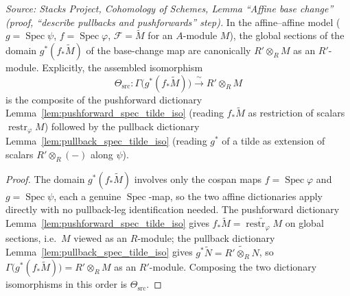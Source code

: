 \begin{lemma}



  \label{lem:base_change_mate_domain_read}
  \textit{Source: Stacks Project, Cohomology of Schemes, Lemma ``Affine base
  change'' (proof, ``describe pullbacks and pushforwards'' step).}
  In the affine--affine model (\(g = \operatorname{Spec}\psi\),
  \(f = \operatorname{Spec}\varphi\), \(\mathcal{F} = \widetilde M\) for an
  \(A\)-module \(M\)), the global sections of the domain \(g^*(f_*\widetilde M)\) of the
  base-change map are canonically \(R' \otimes_R M\) as an \(R'\)-module. Explicitly,
  the assembled isomorphism
  \[
    \Theta_{\mathrm{src}} :
    \Gamma\bigl(g^*(f_*\widetilde M)\bigr) \xrightarrow{\ \sim\ } R' \otimes_R M
  \]
  is the composite of the pushforward dictionary
  Lemma~\ref{lem:pushforward_spec_tilde_iso} (reading \(f_*\widetilde M\) as
  restriction of scalars \(\operatorname{restr}_\varphi M\)) followed by the pullback
  dictionary Lemma~\ref{lem:pullback_spec_tilde_iso} (reading \(g^*\) of a tilde as
  extension of scalars \(R' \otimes_R (-)\) along \(\psi\)).
\end{lemma}

\begin{proof}
  The domain \(g^*(f_*\widetilde M)\) involves only the cospan maps
  \(f = \operatorname{Spec}\varphi\) and \(g = \operatorname{Spec}\psi\), each a genuine
  \(\operatorname{Spec}\)-map, so the two affine dictionaries apply directly with no
  pullback-leg identification needed. The pushforward dictionary
  Lemma~\ref{lem:pushforward_spec_tilde_iso} gives
  \(f_*\widetilde M = \widetilde{\operatorname{restr}_\varphi M}\) on global sections,
  i.e.\ \(M\) viewed as an \(R\)-module; the pullback dictionary
  Lemma~\ref{lem:pullback_spec_tilde_iso} gives
  \(g^*\widetilde N = \widetilde{R' \otimes_R N}\), so
  \(\Gamma\bigl(g^*(f_*\widetilde M)\bigr) = R' \otimes_R M\) as an \(R'\)-module.
  Composing the two dictionary isomorphisms in this order is \(\Theta_{\mathrm{src}}\).
\end{proof}

